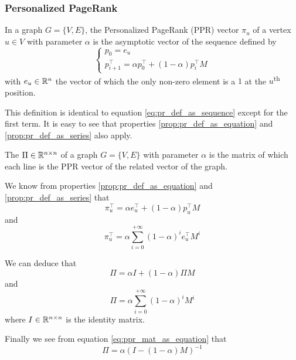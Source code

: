 \subsubsection{Personalized PageRank}
In a graph $G = \{V, E\}$, the Personalized PageRank (PPR) vector $\pi_u$ of a vertex $u \in V$ with parameter $\alpha$ is the asymptotic vector of the sequence defined by 
\begin{equation}\label{eq:ppr_def_as_sequence}
    \begin{cases}
        p_0 = e_u\\
        p_{i+1}^\top = \alpha p_0^\top + (1-\alpha)p_i^\top M
    \end{cases}
\end{equation}
with $e_u \in \mathbb{R}^n$ the vector of which the only non-zero element is a $1$ at the $u$\textsuperscript{th} position.

This definition is identical to equation \ref{eq:pr_def_as_sequence} except for the first term. It is easy to see that properties \ref{prop:pr_def_as_equation} and \ref{prop:pr_def_as_series} also apply.

\begin{definition}
    The  $\Pi \in \mathbb{R}^{n \times n}$ of a graph $G = \{V, E\}$ with parameter $\alpha$ is the matrix of which each line is the PPR vector of the related vector of the graph.
\end{definition}

We know from properties \ref{prop:pr_def_as_equation} and \ref{prop:pr_def_as_series} that
\begin{equation*}
    \pi_u^\top = \alpha e_u^\top + (1-\alpha) p_u^\top M
\end{equation*}
and
\begin{equation*}
    \pi_u^\top = \alpha \sum_{i=0}^{+\infty} (1-\alpha)^i e_u^\top M^i
\end{equation*}

We can deduce that
\begin{equation}\label{eq:ppr_mat_as_equation}
    \Pi = \alpha I + (1-\alpha)\Pi M
\end{equation}
and
\begin{equation}\label{eq:ppr_mat_as_series}
    \Pi = \alpha \sum_{i=0}^{+\infty} (1-\alpha)^i M^i
\end{equation}
where $I\in \mathbb{R}^{n\times n}$ is the identity matrix.

Finally we see from equation \ref{eq:ppr_mat_as_equation} that 
\begin{equation} \label{eq:ppr_mat_as_inverse}
    \Pi = \alpha (I - (1-\alpha)M)^{-1}
\end{equation}

